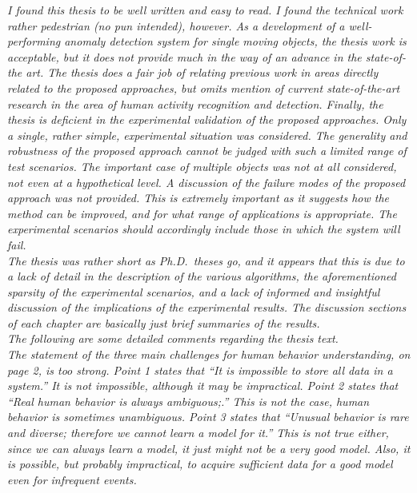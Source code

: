 \documentclass{article}
\begin{document}
\textit{I found this thesis to be well written and easy to read. I found the 
    technical work rather pedestrian (no pun intended), however. As a development 
    of a well-performing anomaly detection system for single moving objects, 
    the thesis work is acceptable, but it does not provide much in the way of 
    an advance in the state-of-the art. The thesis does a fair job of relating 
    previous work in areas directly related to the proposed approaches, but omits 
    mention of current state-of-the-art research in the area of human activity 
    recognition and detection. Finally, the thesis is deficient in the experimental 
    validation of the proposed approaches. Only a single, rather simple, experimental 
    situation was considered. The generality and robustness of the proposed approach 
    cannot be judged with such a limited range of test scenarios. The important 
    case of multiple objects was not at all considered, not even at a hypothetical 
    level. A discussion of the failure modes of the proposed approach was not provided. 
    This is extremely important as it suggests how the method can be improved, and 
    for what range of applications is appropriate. The experimental scenarios 
    should accordingly include those in which the system will fail.} \\

\textit{The thesis was rather short as Ph.D.\ theses go, and it appears that this 
    is due to a lack of detail in the description of the various algorithms, 
    the aforementioned sparsity of the experimental scenarios, and a lack of 
    informed and insightful discussion of the implications of the experimental 
    results. The discussion sections of each chapter are basically just brief 
    summaries of the results.} \\ 

\textit{The following are some detailed comments regarding the thesis text.} \\

\textit{The statement of the three main challenges for human behavior 
    understanding, on page 2, is too strong. Point 1 states that ``It is 
    impossible to store all data in a system.'' It is not impossible, 
    although it may be impractical. Point 2 states that ``Real human behavior 
    is always ambiguous;.'' This is not the case, human behavior is sometimes 
    unambiguous. Point 3 states that ``Unusual behavior is rare and diverse; 
    therefore we cannot learn a model for it.'' This is not true either, 
    since we can always learn a model, it just might not be a very good model. 
    Also, it is possible, but probably impractical, to acquire sufficient data 
    for a good model even for infrequent events.}
\end{document}
